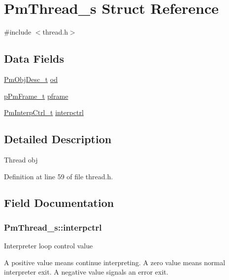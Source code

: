 \hypertarget{struct_pm_thread__s}{\section{Pm\-Thread\-\_\-s Struct Reference}
\label{struct_pm_thread__s}
}


{\ttfamily \#include $<$thread.\-h$>$}

\subsection*{Data Fields}
\begin{DoxyCompactItemize}
\item 
\hyperlink{obj_8h_a72d816790acd8eb550fb25268c2b3489}{Pm\-Obj\-Desc\-\_\-t} \hyperlink{struct_pm_thread__s_aa652f4d964a2dedac2c11b67afe9a951}{od}
\item 
\hyperlink{frame_8h_a648c242e0bdaa439c225efbc41d88e12}{p\-Pm\-Frame\-\_\-t} \hyperlink{struct_pm_thread__s_ad21102bd82c351326781978540fdf4e0}{pframe}
\item 
\hyperlink{thread_8h_a08eb3e3305fd1c8776092e5cb146876a}{Pm\-Interp\-Ctrl\-\_\-t} \hyperlink{struct_pm_thread__s_a4fa4391fa3e30a78f57fa7129880bd31}{interpctrl}
\end{DoxyCompactItemize}


\subsection{Detailed Description}
Thread obj 

Definition at line 59 of file thread.\-h.



\subsection{Field Documentation}
\hypertarget{struct_pm_thread__s_a4fa4391fa3e30a78f57fa7129880bd31}{
\subsubsection[{interpctrl}]{ Pm\-Thread\-\_\-s\-::interpctrl}}\label{struct_pm_thread__s_a4fa4391fa3e30a78f57fa7129880bd31}
Interpreter loop control value

A positive value means continue interpreting. A zero value means normal interpreter exit. A negative value signals an error exit. 

